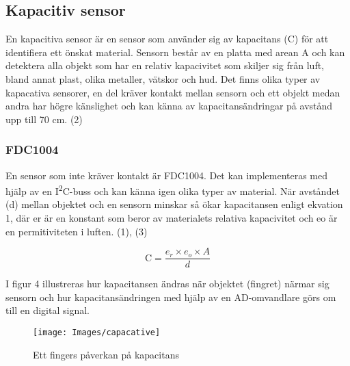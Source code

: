 \documentclass[11pt]{article}
\begin{document}
\begin{flushleft}
\subsection{Kapacitiv sensor}
En kapacitiva sensor är en sensor som använder sig av kapacitans (C) för att identifiera ett önskat material. Sensorn består av en platta med arean A och kan detektera alla objekt som har en relativ kapacivitet som skiljer sig från luft, bland annat plast, olika metaller, vätskor och hud. Det finns olika typer av kapacativa sensorer, en del kräver kontakt mellan sensorn och ett objekt medan andra har högre känslighet och kan känna av kapacitansändringar på avstånd upp till 70 cm. (2)


\subsubsection{FDC1004}
En sensor som inte kräver kontakt är FDC1004. Det kan implementeras med hjälp av en I\textsuperscript{2}C-buss och kan känna igen olika typer av material. När avståndet (d) mellan objektet och en sensorn minskar så ökar kapacitansen enligt ekvation 1, där er är en konstant som beror av materialets relativa kapacivitet och eo är en permitiviteten i luften. (1), (3)

\begin{equation*}
	\textrm{C} = \frac {e_{r} \times e_{o} \times A}{d}						
\end{equation*}

I figur 4 illustreras hur kapacitansen ändras när objektet (fingret) närmar sig sensorn och hur kapacitansändringen med hjälp av en AD-omvandlare görs om till en digital signal. 

\begin{figure}[htbp]
	\centering
	\texttt{[image: Images/capacative]}
	\caption{Ett fingers påverkan på kapacitans \label{capacative}}
\end{figure}



    


\end{flushleft}
\end{document}

